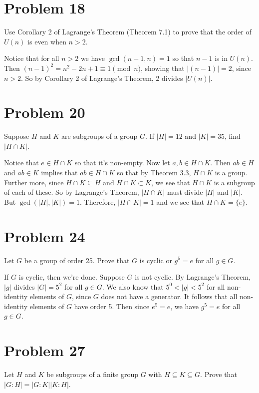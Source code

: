 \documentclass{article}
\begin{document}
\section*{Problem 18}

Use Corollary 2 of Lagrange's Theorem (Theorem 7.1) to prove that
the order of $U(n)$ is even when $n>2$.

Notice that for all $n>2$ we have $\gcd(n-1,n)=1$ so that $n-1$ is in $U(n)$.
Then $(n-1)^2=n^2-2n+1\equiv 1\pmod{n}$, showing that $|(n-1)|=2$, since $n>2$.  So by Corollary
2 of Lagrange's Theorem, 2 divides $|U(n)|$.

\section*{Problem 20}

Suppose $H$ and $K$ are subgroups of a group $G$.  If $|H|=12$ and $|K|=35$,
find $|H\cap K|$.

Notice that $e\in H\cap K$ so that it's non-empty.  Now let $a,b\in H\cap K$.
Then $ab\in H$ and $ab\in K$ implies that $ab\in H\cap K$ so that by Theorem
3.3, $H\cap K$ is a group.  Further more, since $H\cap K\subseteq H$ and
$H\cap K\subset K$, we see that $H\cap K$ is a subgroup of each of these.
So by Lagrange's Theorem, $|H\cap K|$ must divide $|H|$ and $|K|$.
But $\gcd(|H|,|K|)=1$.  Therefore, $|H\cap K|=1$ and we see that $H\cap K=\{e\}$.

\section*{Problem 24}

Let $G$ be a group of order 25.  Prove that $G$ is cyclic or $g^5=e$ for all
$g\in G$.

If $G$ is cyclic, then we're done.  Suppose $G$ is not cyclic.  By Lagrange's Theorem,
$|g|$ divides $|G|=5^2$ for all $g\in G$.  We also know that $5^0<|g|<5^2$ for all
non-identity elements of $G$, since $G$ does not have a generator.
It follows that all non-identity elements of $G$
have order 5.  Then since $e^5=e$, we have $g^5=e$ for all $g\in G$.

\section*{Problem 27}

Let $H$ and $K$ be subgroups of a finite group $G$ with $H\subseteq K\subseteq G$.
Prove that $|G:H|=|G:K||K:H|$.
\end{document}
